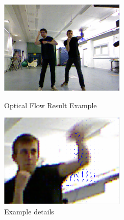\documentclass[runningheads,a4paper]{llncs}
\begin{document}
		\begin{figure}[htbp]
		\centering
		\begin{minipage}[t]{0.49\textwidth}
		\centering
		\includegraphics[width=6cm]{opticalflowresult1.png}
		\caption{Optical Flow Result Example}
		\label{fig:of-1}
		\end{minipage}
		\begin{minipage}[t]{0.49\textwidth}
		\centering
		\includegraphics[width=6cm]{opticalflowresult2.png}
		\caption{Example details}
		\label{fig:of-2}
		\end{minipage}
		\end{figure}
\end{document}
